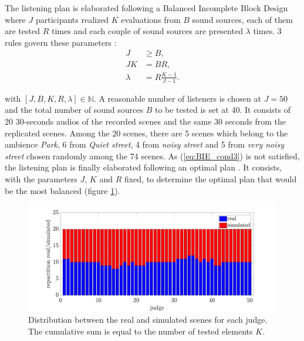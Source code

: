 \documentclass[a4,11pt,twocolumn]{article}
\begin{document}
The listening plan is elaborated following a Balanced Incomplete Block Design \cite{dagnelie_principes_2003} where $J$ participants realized $K$ evaluations from $B$ sound sources, each of them are tested $R$ times and each couple of sound sources are presented $\lambda$ times. 3 rules govern these parameters :
\begin{subequations}\label{eq:BIE_cond}
\begin{align}
J &\geq B, \label{eq:BIE_cond1}\\
JK &= BR, \label{eq:BIE_cond2}\\
\lambda &= R\frac{K-1}{J-1}. \label{eq:BIE_cond3}
\end{align}
\end{subequations}

with $\left[J, B, K, R, \lambda\right] \in \mathbb{N}$. A reasonable number of listeners is chosen at $J = 50$ and the total number of sound sources $B$ to be tested is set at 40. It consists of 20 30-seconds audios of the recorded scenes and the same 30 seconds from the replicated scenes. Among the 20 scenes, there are 5 scenes which belong to the ambience \textit{Park}, 6 from \textit{Quiet street}, 4 from \textit{noisy street} and 5 from \textit{very noisy street} chosen randomly among the 74 scenes. As (\ref{eq:BIE_cond3}) is not satisfied, the listening plan is finally elaborated following an optimal plan \cite{pages_blocs_2007}. It consists, with the parameters $J$, $K$ and $R$ fixed, to determine the optimal plan that would be the most balanced (figure \ref{fig:repartition}).\\

\begin{figure}[ht]
\centering
\includegraphics[width = \linewidth]{./pictures/repartition-real-simulated.pdf}
\caption{Distribution between the real and simulated scenes for each judge. The cumulative sum is equal to the number of tested elements $K$.}
\label{fig:repartition}
\end{figure}
\end{document}
